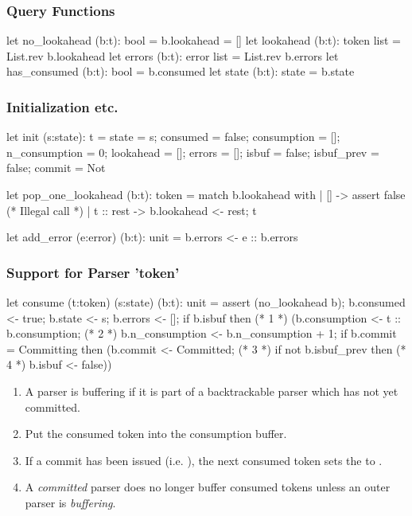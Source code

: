 \subsubsection{Query Functions}

\begin{ocaml}
  let no_lookahead (b:t): bool = b.lookahead = []
  let lookahead    (b:t): token list = List.rev b.lookahead
  let errors       (b:t): error list = List.rev b.errors
  let has_consumed (b:t): bool = b.consumed
  let state        (b:t): state = b.state
\end{ocaml}


\subsubsection{Initialization etc.}

\begin{ocaml}
  let init (s:state): t =
    {state = s;
     consumed = false; consumption = []; n_consumption = 0;
     lookahead = [];
     errors = [];
     isbuf = false; isbuf_prev = false; commit = Not}

  let pop_one_lookahead (b:t): token =
    match b.lookahead with
    | [] -> assert false (* Illegal call *)
    | t :: rest ->
       b.lookahead <- rest;
       t

  let add_error (e:error) (b:t): unit =
    b.errors <- e :: b.errors
\end{ocaml}

\subsubsection{Support for Parser 'token'}

\begin{ocaml}
  let consume (t:token) (s:state) (b:t): unit =
    assert (no_lookahead b);
    b.consumed <- true;
    b.state    <- s;
    b.errors   <- [];
    if b.isbuf then                                    (* 1 *)
       (b.consumption   <- t :: b.consumption;         (* 2 *)
        b.n_consumption <- b.n_consumption + 1;
        if b.commit = Committing then
          (b.commit <- Committed;                      (* 3 *)
           if not b.isbuf_prev then                    (* 4 *)
             b.isbuf <- false))
\end{ocaml}

\begin{enumerate}
\item A parser is buffering if it is part of a backtrackable parser which has
  not yet committed.
\item Put the consumed token into the consumption buffer.
\item If a commit has been issued (i.e. ), the next consumed
  token sets the  to .
\item A \emph{committed} parser does no longer buffer consumed tokens unless
  an outer parser is \emph{buffering}.
\end{enumerate}

